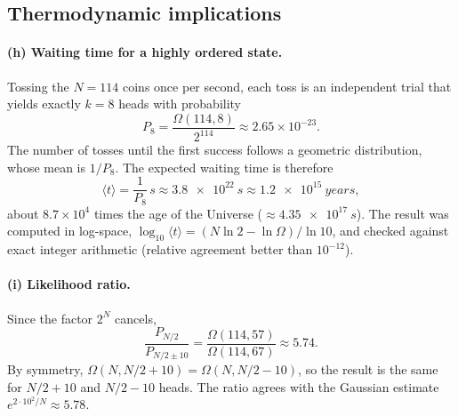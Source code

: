 \subsection{Thermodynamic implications}

\paragraph{(h) Waiting time for a highly ordered state.}
Tossing the $N=114$ coins once per second, each toss is an independent trial
that yields exactly $k=8$ heads with probability
\begin{equation}
  P_8=\frac{\Omega(114,8)}{2^{114}}\approx 2.65\times10^{-23}.
\end{equation}
The number of tosses until the first success follows a geometric
distribution, whose mean is $1/P_8$. The expected waiting time is therefore
\begin{equation}
  \langle t\rangle=\frac{1}{P_8}\,\si{s}\approx\SI{3.8e22}{s}\approx\SI{1.2e15}{years},
\end{equation}
about $8.7\times10^{4}$ times the age of the Universe
($\approx\SI{4.35e17}{s}$). The result was computed in log-space,
$\log_{10}\langle t\rangle=(N\ln2-\ln\Omega)/\ln10$, and checked against exact
integer arithmetic (relative agreement better than $10^{-12}$).

\paragraph{(i) Likelihood ratio.}
Since the factor $2^{N}$ cancels,
\begin{equation}
  \frac{P_{N/2}}{P_{N/2\pm10}}=\frac{\Omega(114,57)}{\Omega(114,67)}\approx 5.74 .
\end{equation}
By symmetry, $\Omega(N,N/2+10)=\Omega(N,N/2-10)$, so the result is the same
for $N/2+10$ and $N/2-10$ heads. The ratio agrees with the Gaussian estimate
$e^{2\cdot10^{2}/N}\approx5.78$.

